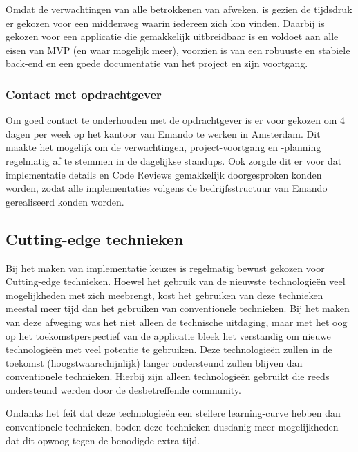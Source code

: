 Omdat de verwachtingen van alle betrokkenen van afweken, is gezien de tijdsdruk er gekozen voor een middenweg waarin iedereen zich kon vinden. Daarbij is gekozen voor een applicatie die gemakkelijk uitbreidbaar is en voldoet aan alle eisen van MVP (en waar mogelijk meer), voorzien is van een robuuste en stabiele back-end en een goede documentatie van het project en zijn voortgang.  

\subsubsection{Contact met opdrachtgever}
Om goed contact te onderhouden met de opdrachtgever is er voor gekozen om 4 dagen per week op het kantoor van Emando te werken in Amsterdam. Dit maakte het mogelijk om de verwachtingen, project-voortgang en -planning regelmatig af te stemmen in de dagelijkse standups. Ook zorgde dit er voor dat implementatie details en Code Reviews gemakkelijk doorgesproken konden worden, zodat alle implementaties volgens de bedrijfsstructuur van Emando gerealiseerd konden worden.

\subsection{Cutting-edge technieken}
Bij het maken van implementatie keuzes is regelmatig bewust gekozen voor Cutting-edge technieken. Hoewel het gebruik van de nieuwste technologieën veel mogelijkheden met zich meebrengt, kost het gebruiken van deze technieken meestal meer tijd dan het gebruiken van conventionele technieken. Bij het maken van deze afweging was het niet alleen de technische uitdaging, maar met het oog op het toekomstperspectief van de applicatie bleek het verstandig om nieuwe technologieën met veel potentie te gebruiken. Deze technologieën zullen in de toekomst (hoogstwaarschijnlijk) langer ondersteund zullen blijven dan conventionele technieken.
Hierbij zijn alleen technologieën gebruikt die reeds ondersteund werden door de desbetreffende community.

Ondanks het feit dat deze technologieën een steilere learning-curve hebben dan conventionele technieken, boden deze technieken dusdanig meer mogelijkheden dat dit opwoog tegen de benodigde extra tijd.